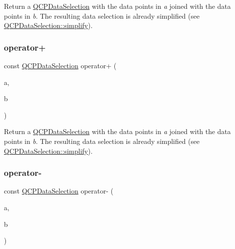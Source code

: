Return a \hyperlink{class_q_c_p_data_selection}{Q\+C\+P\+Data\+Selection} with the data points in {\itshape a} joined with the data points in {\itshape b}. The resulting data selection is already simplified (see \hyperlink{class_q_c_p_data_selection_a4a2fbad1a6e4d1dd26fdfdf88956f2a4}{Q\+C\+P\+Data\+Selection\+::simplify}). \mbox{\label{class_q_c_p_data_selection_a0822e3133b80b5dedfc8050a19c1e0c5}} 
\subsubsection{\texorpdfstring{operator+}{operator+}\hspace{0.1cm}{\footnotesize\ttfamily [4/4]}}
{\footnotesize\ttfamily const \hyperlink{class_q_c_p_data_selection}{Q\+C\+P\+Data\+Selection} operator+ (\begin{DoxyParamCaption}\item[{const \hyperlink{class_q_c_p_data_range}{Q\+C\+P\+Data\+Range} \&}]{a,  }\item[{const \hyperlink{class_q_c_p_data_range}{Q\+C\+P\+Data\+Range} \&}]{b }\end{DoxyParamCaption})\hspace{0.3cm}{\ttfamily [friend]}}

Return a \hyperlink{class_q_c_p_data_selection}{Q\+C\+P\+Data\+Selection} with the data points in {\itshape a} joined with the data points in {\itshape b}. The resulting data selection is already simplified (see \hyperlink{class_q_c_p_data_selection_a4a2fbad1a6e4d1dd26fdfdf88956f2a4}{Q\+C\+P\+Data\+Selection\+::simplify}). \mbox{\label{class_q_c_p_data_selection_a41147ef7d6303c746e398278b7b624d1}} 
\subsubsection{\texorpdfstring{operator-\/}{operator-}\hspace{0.1cm}{\footnotesize\ttfamily [1/4]}}
{\footnotesize\ttfamily const \hyperlink{class_q_c_p_data_selection}{Q\+C\+P\+Data\+Selection} operator-\/ (\begin{DoxyParamCaption}\item[{const \hyperlink{class_q_c_p_data_selection}{Q\+C\+P\+Data\+Selection} \&}]{a,  }\item[{const \hyperlink{class_q_c_p_data_selection}{Q\+C\+P\+Data\+Selection} \&}]{b }\end{DoxyParamCaption})\hspace{0.3cm}{\ttfamily [friend]}}

